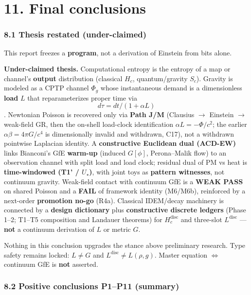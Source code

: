 \documentclass[
  11pt,
]{article}
\begin{document}
\section{11. Final conclusions}\label{final-conclusions}

\subsubsection{8.1 Thesis restated
(under-claimed)}\label{thesis-restated-under-claimed}

This report freezes a \textbf{program}, not a derivation of Einstein
from bits alone.

\textbf{Under-claimed thesis.} Computational entropy is the entropy of a
map or channel's \textbf{output} distribution (classical \(H_c\),
quantum/gravity \(S_c\)). Gravity is modeled as a CPTP channel
\(\Phi_g\) whose instantaneous demand is a dimensionless \textbf{load}
\(L\) that reparameterizes proper time via \[d\tau=dt/(1+\alpha L)\].
Newtonian Poisson is recovered only via \textbf{Path J/M} (Clausius $\to$
Einstein $\to$ weak-field GR, then the on-shell load-clock identification
\(\alpha L=-\Phi/c^2\); the earlier \(\alpha\beta=4\pi G/c^4\)
is dimensionally invalid and withdrawn, C17), not a withdrawn pointwise Laplacian
identity. A \textbf{constructive Euclidean dual (ACD-EW)} links
Bianconi's GfE \textbf{warm-up} (induced \(G[\phi]\), Perona--Malik
flow) to an observation channel with split load and load clock; residual
dual of PM vs heat is \textbf{time-windowed (T1' / \(U_\star\))}, with
joint toys as \textbf{pattern witnesses}, not continuum gravity.
Weak-field contact with continuum GfE is a \textbf{WEAK PASS} on shared
Poisson and a \textbf{FAIL} of framework identity (M6/M6b), reinforced
by a next-order \textbf{promotion no-go} (R4a). Classical IDEM/decay
machinery is connected by a \textbf{design dictionary} plus
\textbf{constructive discrete ledgers} (Phase 1--2; T1--T5 composition
and Landauer theorems) for \(H_c^{\mathrm{disc}}\) and three-slot
\(L^{\mathrm{disc}}\) --- \textbf{not} a continuum derivation of \(L\)
or metric \(G\).

Nothing in this conclusion upgrades the stance above preliminary
research. Type safety remains locked: \textbf{\(L\neq G\)} and
\(L^{\mathrm{disc}}\neq L(\rho,g)\). Master equation \(\Leftrightarrow\)
continuum GfE is \textbf{not} asserted.

\subsubsection{8.2 Positive conclusions P1--P11
(summary)}\label{positive-conclusions-p1p11-summary}
\end{document}
